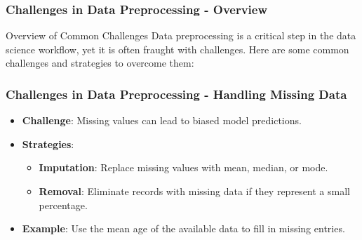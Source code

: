\documentclass[aspectratio=169]{beamer}
\begin{document}
\begin{frame}[fragile]
    \frametitle{Challenges in Data Preprocessing - Overview}
    \begin{block}{Overview of Common Challenges}
        Data preprocessing is a critical step in the data science workflow,
        yet it is often fraught with challenges. Here are some common challenges 
        and strategies to overcome them:
    \end{block}
\end{frame}

\begin{frame}[fragile]
    \frametitle{Challenges in Data Preprocessing - Handling Missing Data}
    \begin{itemize}
        \item \textbf{Challenge}: Missing values can lead to biased model predictions.
        \item \textbf{Strategies}:
            \begin{itemize}
                \item \textbf{Imputation}: Replace missing values with mean, median, or mode.
                \item \textbf{Removal}: Eliminate records with missing data if they represent a 
                small percentage.
            \end{itemize}
        \item \textbf{Example}: Use the mean age of the available data to fill in missing entries.
    \end{itemize}
\end{frame}
\end{document}
